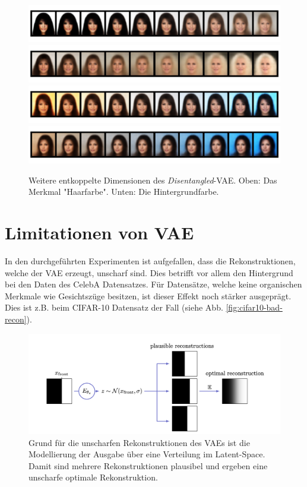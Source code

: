 \begin{figure}[H]
  \centering
  \includegraphics[width=.9\textwidth]{gfx/evaluation/celeba/CelebA-hair-color_1}
  \includegraphics[width=.9\textwidth]{gfx/evaluation/celeba/CelebA-hair-color_3}
  \includegraphics[width=.9\textwidth]{gfx/evaluation/celeba/CelebA-bg-color_1}
  \includegraphics[width=.9\textwidth]{gfx/evaluation/celeba/CelebA-bg-color_3}
  \caption{Weitere entkoppelte Dimensionen des \textit{Disentangled}-VAE. Oben: Das Merkmal "Haarfarbe". Unten: Die Hintergrundfarbe.}
  \label{fig:celeba_disentanglement_examples}
\end{figure}



\section{Limitationen von VAE}
In den durchgeführten Experimenten ist aufgefallen, dass die Rekonstruktionen, welche der VAE erzeugt, unscharf sind. Dies betrifft vor allem den Hintergrund bei den Daten des CelebA Datensatzes. Für Datensätze, welche keine organischen Merkmale wie Gesichtszüge besitzen, ist dieser Effekt noch stärker ausgeprägt. Dies ist z.B. beim CIFAR-10 Datensatz der Fall (siehe Abb. \ref{fig:cifar10-bad-recon}).

\begin{figure}[H]
  \centering
  \includegraphics[width=.9\textwidth]{gfx/evaluation/recon_blur}
  \caption{Grund für die unscharfen Rekonstruktionen des VAEs ist die Modellierung der Ausgabe über eine Verteilung im Latent-Space. Damit sind mehrere Rekonstruktionen plausibel und ergeben eine unscharfe optimale Rekonstruktion.}
  \label{fig:blur_explained}
\end{figure}

